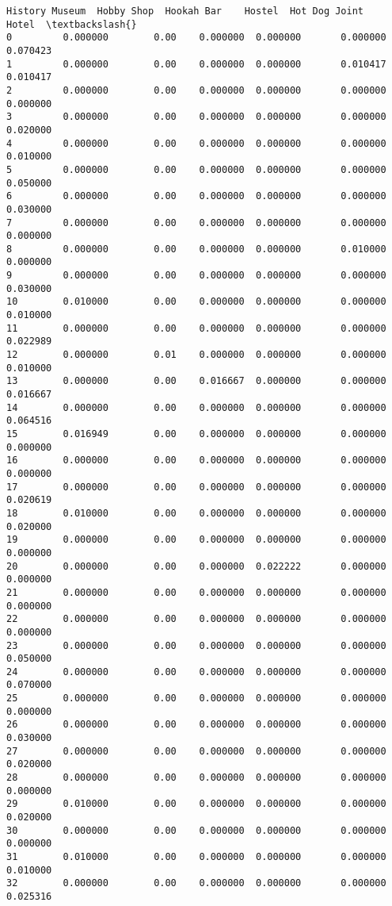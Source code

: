 \documentclass[11pt]{article}
\begin{document}
\begin{tcolorbox}[breakable, size=fbox, boxrule=.5pt, pad at break*=1mm, opacityfill=0]
\begin{Verbatim}[commandchars=\\\{\}]
    History Museum  Hobby Shop  Hookah Bar    Hostel  Hot Dog Joint     Hotel  \textbackslash{}
0         0.000000        0.00    0.000000  0.000000       0.000000  0.070423
1         0.000000        0.00    0.000000  0.000000       0.010417  0.010417
2         0.000000        0.00    0.000000  0.000000       0.000000  0.000000
3         0.000000        0.00    0.000000  0.000000       0.000000  0.020000
4         0.000000        0.00    0.000000  0.000000       0.000000  0.010000
5         0.000000        0.00    0.000000  0.000000       0.000000  0.050000
6         0.000000        0.00    0.000000  0.000000       0.000000  0.030000
7         0.000000        0.00    0.000000  0.000000       0.000000  0.000000
8         0.000000        0.00    0.000000  0.000000       0.010000  0.000000
9         0.000000        0.00    0.000000  0.000000       0.000000  0.030000
10        0.010000        0.00    0.000000  0.000000       0.000000  0.010000
11        0.000000        0.00    0.000000  0.000000       0.000000  0.022989
12        0.000000        0.01    0.000000  0.000000       0.000000  0.010000
13        0.000000        0.00    0.016667  0.000000       0.000000  0.016667
14        0.000000        0.00    0.000000  0.000000       0.000000  0.064516
15        0.016949        0.00    0.000000  0.000000       0.000000  0.000000
16        0.000000        0.00    0.000000  0.000000       0.000000  0.000000
17        0.000000        0.00    0.000000  0.000000       0.000000  0.020619
18        0.010000        0.00    0.000000  0.000000       0.000000  0.020000
19        0.000000        0.00    0.000000  0.000000       0.000000  0.000000
20        0.000000        0.00    0.000000  0.022222       0.000000  0.000000
21        0.000000        0.00    0.000000  0.000000       0.000000  0.000000
22        0.000000        0.00    0.000000  0.000000       0.000000  0.000000
23        0.000000        0.00    0.000000  0.000000       0.000000  0.050000
24        0.000000        0.00    0.000000  0.000000       0.000000  0.070000
25        0.000000        0.00    0.000000  0.000000       0.000000  0.000000
26        0.000000        0.00    0.000000  0.000000       0.000000  0.030000
27        0.000000        0.00    0.000000  0.000000       0.000000  0.020000
28        0.000000        0.00    0.000000  0.000000       0.000000  0.000000
29        0.010000        0.00    0.000000  0.000000       0.000000  0.020000
30        0.000000        0.00    0.000000  0.000000       0.000000  0.000000
31        0.010000        0.00    0.000000  0.000000       0.000000  0.010000
32        0.000000        0.00    0.000000  0.000000       0.000000  0.025316

\end{Verbatim}
\end{tcolorbox}
\end{document}
